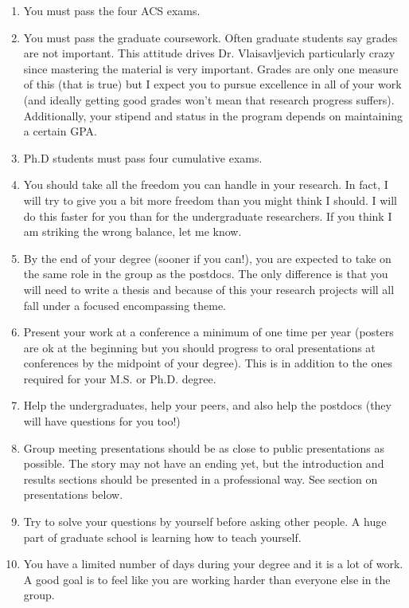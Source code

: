 \documentclass[letterpaper]{article}
\begin{document}
\begin{enumerate}
\item You must pass the four ACS exams.
\item You must pass the graduate coursework. Often graduate students say grades are not important. This attitude drives Dr. Vlaisavljevich particularly crazy since mastering the material is very important. Grades are only one measure of this (that is true) but I expect you to pursue excellence in all of your work (and ideally getting good grades won't mean that research progress suffers). Additionally, your stipend and status in the program depends on maintaining a certain GPA.
\item Ph.D students must pass four cumulative exams. 
\item You should take all the freedom you can handle in your research. In fact, I will try to give you a bit more freedom than you might think I should.  I will do this faster for you than for the undergraduate researchers. If you think I am striking the wrong balance, let me know.
\item By the end of your degree (sooner if  you can!), you are expected to take on the same role in the group as the postdocs. The only difference is that you will need to write a thesis and because of this your research projects will all fall under a focused encompassing theme.
\item Present your work at a conference a minimum of one time per year (posters are ok at the beginning but you should progress to oral presentations at conferences by the midpoint of your degree). This is in addition to the ones required for your M.S. or Ph.D. degree.
\item Help the undergraduates, help your peers, and also help the postdocs (they will have questions for you too!)
\item Group meeting presentations should be as close to public presentations as possible. The story may not have an ending yet, but the introduction and results sections should be presented in a professional way. See section on presentations below.
\item Try to solve your questions by yourself before asking other people. A huge part of graduate school is learning how to teach yourself.
\item You have a limited number of days during your degree and it is a lot of work. A good goal is to feel like you are working harder than everyone else in the group.
\end{enumerate}
\end{document}
